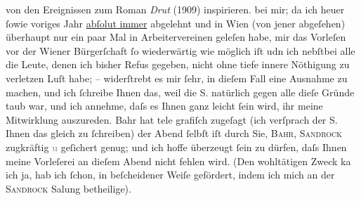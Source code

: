 \begin{ledgroupsized}[t]{13cm}
{{{                  von den Ereignissen zum Roman \emph{Drut}
                     (1909) inspirieren.}}}\label{K_L02995-1h} bei mir; da ich heuer ſowie voriges
               Jahr \uline{abſolut immer} abgelehnt  und in Wien
               (von jener \label{K_L02995-2v}\label{K_L02995-2h} abgeſehen)
               überhaupt nur ein paar Mal in Arbeitervereinen geleſen habe, mir das Vorleſen vor der
                  Wiener Bürgerſchaft ſo wiederwärtig wie möglich
               iſt udn ich nebſtbei {\pb}alle die
               Leute, denen ich bisher Refus gegeben, nicht ohne tiefe innere Nöthigung zu verletzen
               Luſt habe; – widerſtrebt es mir ſehr, in dieſem Fall eine Ausnahme zu machen, und ich
               ſchreibe Ihnen das, weil die \textsc{S.} natürlich gegen alle dieſe Gründe taub war, und ich annehme, daſs es Ihnen ganz
               leicht ſein wird, ihr meine Mitwirklung auszureden. Bahr hat tele {\pb}grafiſch
               zugeſagt (ich verſprach der \textsc{S.} Ihnen das gleich zu ſchreiben) der Abend ſelbſt iſt durch Sie, \textsc{Bahr}, \textsc{Sandrock} zugkräftig \textcolor{gray}{u} geſichert genug; und ich hoffe überzeugt ſein
               zu dürfen, daſs Ihnen meine Vorleſerei an dieſem Abend nicht fehlen wird. (Den
               wohltätigen Zweck ka{\geminationn} ich ja, hab ich ſchon, in
               beſcheidener Weiſe gefördert, indem ich mich an der \textsc{Sandrock} Sa{\geminationm}lung betheilige{\dotstwo}).

\end{ledgroupsized}
